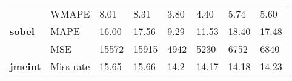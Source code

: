 \begin{table}[thbp]
{\begin{tabular}{|l|l|l|l|l|l|l|l|}
			\multirow{3}{*}{\textbf{sobel}}        & WMAPE               & 8.01                & 8.31                   & 3.80                & 4.40                   & 5.74                & 5.60                   \\ \cline{2-8} 
			& MAPE                & 16.00               & 17.56                  & 9.29                & 11.53                  & 18.40               & 17.48                  \\ \cline{2-8} 
			& MSE                 & 15572               & 15915                  & 4942                & 5230                   & 6752                & 6840                   \\ \hline
			\textbf{jmeint}                        & Miss rate           & 15.65               & 15.66                  & 14.2                & 14.17                  & 14.18               & 14.23                  \\ \hline
		\end{tabular}%
	}
\end{table}
